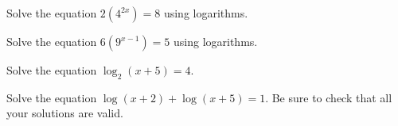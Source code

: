 \documentclass[11pt,letterpaper]{article}
\begin{document}

 Solve the equation $2(4^{2x})= 8$ using logarithms. \pspace





\newpage





 Solve the equation $6(9^{x-1})= 5$ using logarithms. \pspace





\newpage





 Solve the equation $\log_2(x + 5)= 4$. \pspace





\newpage





 Solve the equation $\log(x + 2) + \log(x + 5)= 1$. Be sure to check that all your solutions are valid. \pspace


\end{document}
